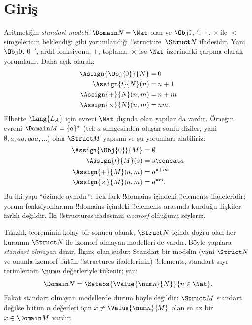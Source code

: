 

\section{Giriş}

Aritmetiğin \emph{standart modeli}, $\Domain N=\Nat$ olan ve
$\Obj0$, $\prime$, $+$, $\times$ ile $<$ simgelerinin beklendiği gibi
yorumlandığı !!{structure}~$\Struct N$ ifadesidir. Yani $\Obj0$, $0$;
$\prime$, ardıl fonksiyonu; $+$, toplama; $\times$ ise $\Nat$
üzerindeki çarpma olarak yorumlanır. Daha açık olarak:
\begin{align*}
  \Assign{\Obj{0}}{N} & = 0\\
  \Assign{\prime}{N}(n) & = n + 1\\
  \Assign{+}{N}(n, m) & = n + m\\
  \Assign{\times}{N}(n, m) & = nm.
\end{align*}
Elbette $\Lang{L_A}$ için evreni $\Nat$ dışında olan yapılar da
vardır. Örneğin evreni $\Domain M=\{a\}^*$ (tek $a$ simgesinden oluşan
sonlu diziler, yani $\emptyset,a,aa,aaa,\dots$) olan $\Struct M$
yapısını ve şu yorumları alabiliriz:
\begin{align*}
  \Assign{\Obj{0}}{M} & = \emptyset\\
  \Assign{\prime}{M}(s) & = s \concat a\\
  \Assign{+}{M}(n, m) & = a^{n + m}\\
  \Assign{\times}{M}(n, m) & = a^{nm}.
\end{align*}
Bu iki yapı ``özünde aynıdır'': Tek fark !!{domain}s içindeki
!!{element}s ifadeleridir; yorum fonksiyonlarının !!{domain}s
içindeki !!{element}s arasında kurduğu ilişkiler farklı değildir.
İki !!{structure}s ifadesinin \emph{izomorf} olduğunu söyleriz.

Tıkızlık teoreminin kolay bir sonucu olarak, $\Struct N$ içinde doğru
olan her kuramın $\Struct N$ ile izomorf olmayan modelleri de vardır.
Böyle yapılara \emph{standart olmayan} denir. İlginç olan şudur:
Standart bir modelin (yani $\Struct N$ ve onunla izomorf bütün
!!{structure}s ifadelerinin) !!{element}s, standart sayı terimlerinin
$\num n$ değerleriyle tükenir; yani
\[
\Domain N=\Setabs{\Value{\num n}{N}}{n\in\Nat}.
\]
Fakat standart olmayan modellerde durum böyle değildir: $\Struct M$
standart değilse bütün $n$ değerleri için
$x\neq\Value{\num n}{M}$ olan en az bir $x\in\Domain M$ vardır.

